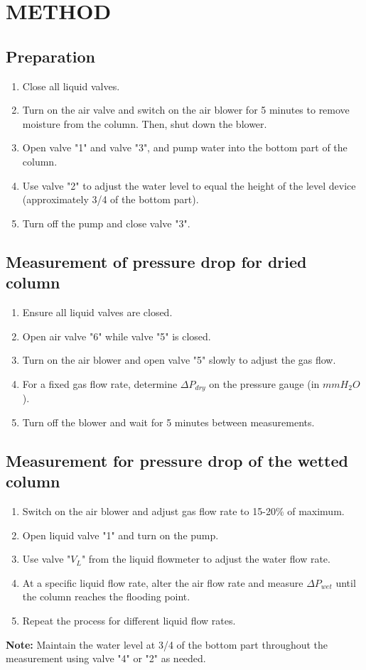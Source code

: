 \section{METHOD}

\subsection{Preparation}
\begin{enumerate}
    \item Close all liquid valves.
    \item Turn on the air valve and switch on the air blower for 5 minutes to remove moisture from the column. Then, shut down the blower.
    \item Open valve "1" and valve "3", and pump water into the bottom part of the column.
    \item Use valve "2" to adjust the water level to equal the height of the level device (approximately 3/4 of the bottom part).
    \item Turn off the pump and close valve "3".
\end{enumerate}

\subsection{Measurement of pressure drop for dried column}
\begin{enumerate}
    \item Ensure all liquid valves are closed.
    \item Open air valve "6" while valve "5" is closed.
    \item Turn on the air blower and open valve "5" slowly to adjust the gas flow.
    \item For a fixed gas flow rate, determine $\Delta P_{dry}$ on the pressure gauge (in $mmH_2O$).
    \item Turn off the blower and wait for 5 minutes between measurements.
\end{enumerate}

\subsection{Measurement for pressure drop of the wetted column}
\begin{enumerate}
    \item Switch on the air blower and adjust gas flow rate to 15-20\% of maximum.
    \item Open liquid valve "1" and turn on the pump.
    \item Use valve "$V_L$" from the liquid flowmeter to adjust the water flow rate.
    \item At a specific liquid flow rate, alter the air flow rate and measure $\Delta P_{wet}$ until the column reaches the flooding point.
    \item Repeat the process for different liquid flow rates.
\end{enumerate}

\textbf{Note:} Maintain the water level at 3/4 of the bottom part throughout the measurement using valve "4" or "2" as needed.
